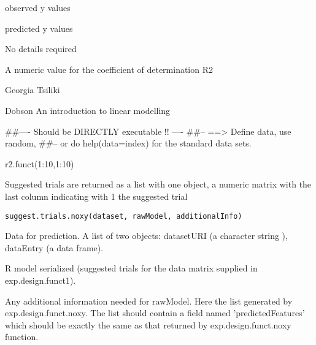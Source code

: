 \documentclass[letterpaper]{book}
\begin{document}
\begin{Arguments}
\begin{ldescription}
\item[\code{y}]  observed y values
\item[\code{y.new}]  predicted y values
\end{ldescription}
\end{Arguments}
%
\begin{Details}\relax
No details required 
\end{Details}
%
\begin{Value}
A numeric value for the coefficient of determination R2 
\end{Value}
%
\begin{Author}\relax
 Georgia Tsiliki 
\end{Author}
%
\begin{References}\relax
Dobson An introduction to linear modelling
\end{References}
%
\begin{Examples}
\begin{ExampleCode}
##---- Should be DIRECTLY executable !! ----
##-- ==>  Define data, use random,
##--	or do  help(data=index)  for the standard data sets.

r2.funct(1:10,1:10)
\end{ExampleCode}
\end{Examples}
%
\begin{Description}\relax
Suggested trials are returned as a list with one object, a numeric matrix with the last column indicating with 1 the suggested trial
\end{Description}
%
\begin{Usage}
\begin{verbatim}
suggest.trials.noxy(dataset, rawModel, additionalInfo)
\end{verbatim}
\end{Usage}
%
\begin{Arguments}
\begin{ldescription}
\item[\code{dataset}]  Data for prediction. A list of two objects: datasetURI (a character string ), dataEntry (a data frame).
\item[\code{rawModel}]  R model serialized (suggested trials for the data matrix supplied in exp.design.funct1). 

\item[\code{additionalInfo}]  Any additional information needed for rawModel. Here the list generated by exp.design.funct.noxy. The list should contain a field named 'predictedFeatures' which should be exactly the same as that returned by exp.design.funct.noxy function. 

\end{ldescription}
\end{Arguments}
\end{document}
